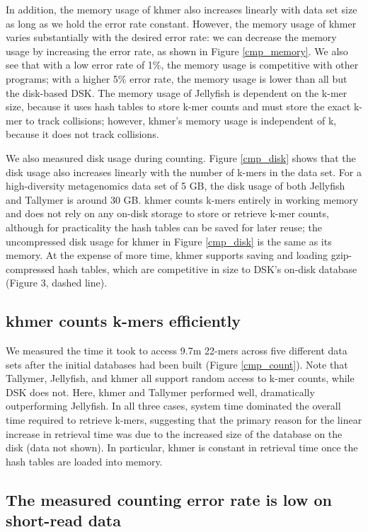 \documentclass{article}
\begin{document}
In addition, the memory usage of khmer also increases linearly with
data set size as long as we hold the error rate constant.  However,
the memory usage of khmer varies substantially with the desired error
rate: we can decrease the memory usage by increasing the
error rate, as shown in Figure \ref{cmp_memory}.  We also
see that with a low error rate of 1\%, the
memory usage is competitive with other programs; with a higher 5\%
error rate, the memory usage is lower than all but the
disk-based DSK.
The memory usage of Jellyfish is dependent on the k-mer
size, because it uses hash tables to store k-mer counts and must store
the exact k-mer to track collisions; however, khmer's memory
usage is independent of k, because it does not track collisions.

We also measured disk usage during counting.
Figure \ref{cmp_disk} shows that
the disk usage also increases linearly with the number of k-mers in the
data set.
For a high-diversity metagenomics
data set of 5 GB, the disk usage of both Jellyfish and Tallymer is
around 30 GB.  khmer counts k-mers entirely in working memory and does
not rely on any on-disk storage to store or retrieve k-mer counts,
although for practicality the hash tables can be saved for later
reuse; the uncompressed disk usage for khmer in Figure \ref{cmp_disk}
is the same as its memory.  At the expense of more time, khmer
supports saving and loading gzip-compressed hash tables, which are
competitive in size to DSK's on-disk database (Figure 3, dashed line).

\subsection{khmer counts k-mers efficiently}

We measured the time it took to access 9.7m 22-mers across five
different data sets after the initial databases had been built (Figure
\ref{cmp_count}).  Note that Tallymer, Jellyfish, and khmer all
support random access to k-mer counts, while DSK does not. Here,
khmer and Tallymer performed well, dramatically outperforming
Jellyfish.  In all three cases, system time dominated the overall time
required to retrieve k-mers, suggesting that the primary reason for
the linear increase in retrieval time was due to the increased size of
the database on the disk (data not shown).  In particular, khmer is
constant in retrieval time once the hash tables are loaded into
memory.

\subsection{The measured counting error rate is low on short-read data}
\end{document}
